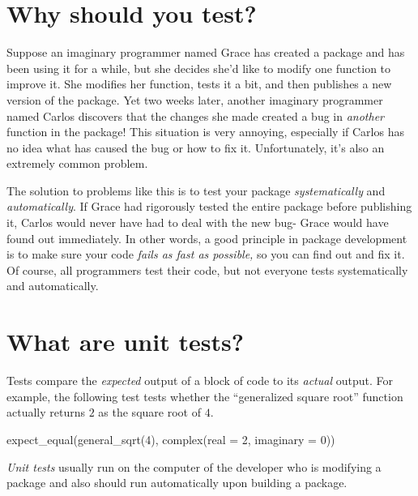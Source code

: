 \documentclass[
]{book}
\newenvironment{Shaded}{\begin{snugshade}}{\end{snugshade}}
\newcommand{\AttributeTok}[1]{\textcolor[rgb]{0.77,0.63,0.00}{#1}}
\newcommand{\DecValTok}[1]{\textcolor[rgb]{0.00,0.00,0.81}{#1}}
\newcommand{\FunctionTok}[1]{\textcolor[rgb]{0.00,0.00,0.00}{#1}}
\newcommand{\NormalTok}[1]{#1}
\begin{document}
\hypertarget{why-should-you-test}{%
\section{Why should you test?}\label{why-should-you-test}}

Suppose an imaginary programmer named Grace has created a package and has been using it for a while, but she decides she'd like to modify one function to improve it. She modifies her function, tests it a bit, and then publishes a new version of the package. Yet two weeks later, another imaginary programmer named Carlos discovers that the changes she made created a bug in \emph{another} function in the package! This situation is very annoying, especially if Carlos has no idea what has caused the bug or how to fix it. Unfortunately, it's also an extremely common problem.

The solution to problems like this is to test your package \emph{systematically} and \emph{automatically}. If Grace had rigorously tested the entire package before publishing it, Carlos would never have had to deal with the new bug- Grace would have found out immediately. In other words, a good principle in package development is to make sure your code \emph{fails as fast as possible,} so you can find out and fix it. Of course, all programmers test their code, but not everyone tests systematically and automatically.

\hypertarget{what-are-unit-tests}{%
\section{What are unit tests?}\label{what-are-unit-tests}}

Tests compare the \emph{expected} output of a block of code to its \emph{actual} output. For example, the following test tests whether the ``generalized square root'' function actually returns \(2\) as the square root of \(4\).

\begin{Shaded}
\begin{Highlighting}[]
\FunctionTok{expect\_equal}\NormalTok{(}\FunctionTok{general\_sqrt}\NormalTok{(}\DecValTok{4}\NormalTok{), }\FunctionTok{complex}\NormalTok{(}\AttributeTok{real =} \DecValTok{2}\NormalTok{, }\AttributeTok{imaginary =} \DecValTok{0}\NormalTok{))}
\end{Highlighting}
\end{Shaded}

\emph{Unit tests} usually run on the computer of the developer who is modifying a package and also should run automatically upon building a package.
\end{document}
